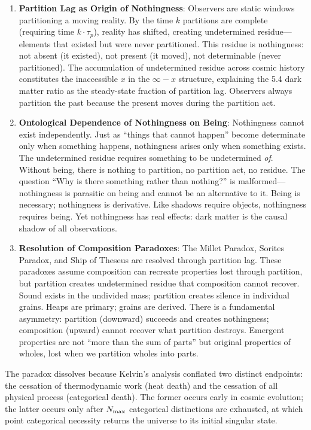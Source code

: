 \begin{enumerate}
    \item \textbf{Partition Lag as Origin of Nothingness}: Observers are static windows partitioning a moving reality. By the time $k$ partitions are complete (requiring time $k \cdot \tau_p$), reality has shifted, creating undetermined residue---elements that existed but were never partitioned. This residue is nothingness: not absent (it existed), not present (it moved), not determinable (never partitioned). The accumulation of undetermined residue across cosmic history constitutes the inaccessible $x$ in the $\infty - x$ structure, explaining the 5.4 dark matter ratio as the steady-state fraction of partition lag. Observers always partition the past because the present moves during the partition act.

    \item \textbf{Ontological Dependence of Nothingness on Being}: Nothingness cannot exist independently. Just as ``things that cannot happen'' become determinate only when something happens, nothingness arises only when something exists. The undetermined residue requires something to be undetermined \emph{of}. Without being, there is nothing to partition, no partition act, no residue. The question ``Why is there something rather than nothing?'' is malformed---nothingness is parasitic on being and cannot be an alternative to it. Being is necessary; nothingness is derivative. Like shadows require objects, nothingness requires being. Yet nothingness has real effects: dark matter is the causal shadow of all observations.
    
    \item \textbf{Resolution of Composition Paradoxes}: The Millet Paradox, Sorites Paradox, and Ship of Theseus are resolved through partition lag. These paradoxes assume composition can recreate properties lost through partition, but partition creates undetermined residue that composition cannot recover. Sound exists in the undivided mass; partition creates silence in individual grains. Heaps are primary; grains are derived. There is a fundamental asymmetry: partition (downward) succeeds and creates nothingness; composition (upward) cannot recover what partition destroys. Emergent properties are not ``more than the sum of parts'' but original properties of wholes, lost when we partition wholes into parts.
\end{enumerate}

The paradox dissolves because Kelvin's analysis conflated two distinct endpoints: the cessation of thermodynamic work (heat death) and the cessation of all physical process (categorical death). The former occurs early in cosmic evolution; the latter occurs only after $N_{\text{max}}$ categorical distinctions are exhausted, at which point categorical necessity returns the universe to its initial singular state.

